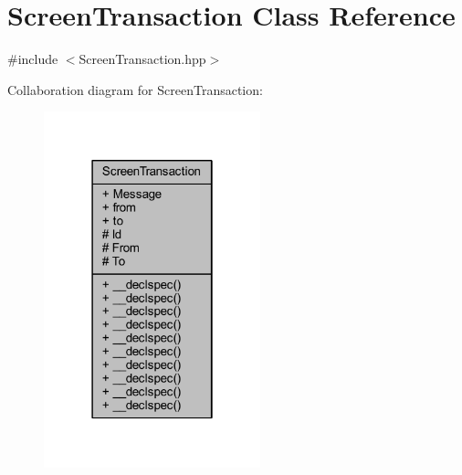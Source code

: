 \hypertarget{class_screen_transaction}{\section{Screen\-Transaction Class Reference}
\label{class_screen_transaction}
}


{\ttfamily \#include $<$Screen\-Transaction.\-hpp$>$}



Collaboration diagram for Screen\-Transaction\-:\nopagebreak
\begin{figure}[H]
\begin{center}
\leavevmode
\includegraphics[width=178pt]{class_screen_transaction__coll__graph}
\end{center}
\end{figure}
